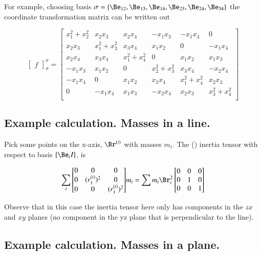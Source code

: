 \documentclass{article}      %
\newcommand{\matrixoftx}[3]{
{
\begin{bmatrix}
{#1}
\end{bmatrix}
}_{#2}^{#3}
}
\begin{document}
For example, choosing basis $\sigma = \{ \Be_{12}, \Be_{13}, \Be_{14}, \Be_{23}, \Be_{24}, \Be_{34} \}$ the coordinate transformation matrix can be written out

\[
\matrixoftx{f}{\sigma}{\sigma}
=
\begin{bmatrix}
x_1^2 + x_2^2     &     x_2 x_3      &     x_2 x_4    &     -x_1 x_3      &    -x_1 x_4    &     0 \\
x_2 x_3           & x_1^2 + x_3^2    &     x_3 x_4      &     x_1 x_2    &            0  & -x_1 x_4 \\
x_2 x_4           &  x_3 x_4         & x_1^2 + x_4^2    &         0    &      x_1 x_2    & x_1 x_3 \\
-x_1 x_3          &  x_1 x_2         &          0     & x_2^2 + x_3^2  &      x_3 x_4    & -x_2 x_4 \\
-x_1 x_4          &  0             &     x_1 x_2      &     x_3 x_4    & x_1^2 + x_4^2   & x_2 x_3 \\
   0            &  -x_1 x_4        &     x_1 x_3      &    -x_2 x_4    &      x_2 x_3    &  x_3^2 + x_4^2 \\
\end{bmatrix}
\]

\subsection{ Example calculation.  Masses in a line. }

Pick some points on the x-axis, $\Br^{(i)}$ with masses $m_i$.
The () inertia tensor with respect to basis $\{\Be_i I\}$, is

\[
\sum_i {
\begin{bmatrix}
 0 & 0               & 0      \\
 0 & (r^{(i)}_1)^2     & 0      \\
 0 & 0               & (r^{(i)}_1)^2  \\
\end{bmatrix}
} m_i
= \sum{ m_i \Br_i^2}
\begin{bmatrix}
0 & 0 & 0 \\
0 & 1 & 0 \\
0 & 0 & 1 \\
\end{bmatrix}
\]

Observe that in this case the inertia tensor here only has components in the $zx$ and $xy$ planes (no component in the yz plane that is perpendicular to the line).

\subsection{ Example calculation.  Masses in a plane. }
\end{document}
